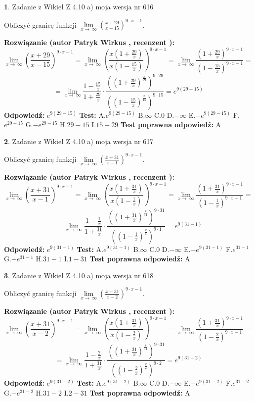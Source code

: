 \documentclass[12pt, a4paper]{article}
\theoremstyle{definition} %
\newtheorem{zad}{}
\newcommand{\zadStart}[1]{\begin{zad}#1\newline}
\newcommand{\zadStop}{\end{zad}}
\newcommand{\rozwStart}[2]{\noindent \textbf{Rozwiązanie (autor #1 , recenzent #2): }\newline}
\newcommand{\rozwStop}{\newline}
\newcommand{\odpStart}{\noindent \textbf{Odpowiedź:}\newline}
\newcommand{\odpStop}{\newline}
\newcommand{\testStart}{\noindent \textbf{Test:}\newline}
\newcommand{\testStop}{\newline}
\newcommand{\kluczStart}{\noindent \textbf{Test poprawna odpowiedź:}\newline}
\newcommand{\kluczStop}{\newline}
\begin{document}
\zadStart{Zadanie z Wikieł Z 4.10 a) moja wersja nr 616}


Obliczyć granicę funkcji  $\lim\limits_{x\to\ \infty}(\frac{x+29}{x-15})^{9\cdot x-1}$.
\zadStop
\rozwStart{Patryk Wirkus}{}
$$\lim\limits_{x\to\ \infty}(\frac{x+29}{x-15})^{9\cdot x-1} = \lim\limits_{x\to\ \infty}(\frac{x(1+\frac{29}{x})}{x(1-\frac{15}{x})})^{9\cdot x-1}=\lim\limits_{x\to\ \infty}\frac{(1+\frac{29}{x})^{9\cdot x-1}}{(1-\frac{15}{x})^{9\cdot x-1}}=$$
$$=\lim\limits_{x\to\ \infty}\frac{1-\frac{15}{x}}{1+\frac{29}{x}}\cdot\frac{((1+\frac{29}{x})^{\frac{x}{29}})^{9\cdot29}}{((1-\frac{15}{x})^{\frac{x}{15}})^{9\cdot15}}=e^{9(29-15)}$$
\rozwStop
\odpStart
$e^{9(29-15)}$
\odpStop
\testStart
A.$e^{9(29-15)}$ B.$\infty$ C.$0$ D.$-\infty$ E.$-e^{9(29-15)}$
F.$e^{29-15}$ G.$-e^{29-15}$
H.$29-15$
I.$15-29$
\testStop
\kluczStart
A
\kluczStop



\zadStart{Zadanie z Wikieł Z 4.10 a) moja wersja nr 617}


Obliczyć granicę funkcji  $\lim\limits_{x\to\ \infty}(\frac{x+31}{x-1})^{9\cdot x-1}$.
\zadStop
\rozwStart{Patryk Wirkus}{}
$$\lim\limits_{x\to\ \infty}(\frac{x+31}{x-1})^{9\cdot x-1} = \lim\limits_{x\to\ \infty}(\frac{x(1+\frac{31}{x})}{x(1-\frac{1}{x})})^{9\cdot x-1}=\lim\limits_{x\to\ \infty}\frac{(1+\frac{31}{x})^{9\cdot x-1}}{(1-\frac{1}{x})^{9\cdot x-1}}=$$
$$=\lim\limits_{x\to\ \infty}\frac{1-\frac{1}{x}}{1+\frac{31}{x}}\cdot\frac{((1+\frac{31}{x})^{\frac{x}{31}})^{9\cdot31}}{((1-\frac{1}{x})^{\frac{x}{1}})^{9\cdot1}}=e^{9(31-1)}$$
\rozwStop
\odpStart
$e^{9(31-1)}$
\odpStop
\testStart
A.$e^{9(31-1)}$ B.$\infty$ C.$0$ D.$-\infty$ E.$-e^{9(31-1)}$
F.$e^{31-1}$ G.$-e^{31-1}$
H.$31-1$
I.$1-31$
\testStop
\kluczStart
A
\kluczStop



\zadStart{Zadanie z Wikieł Z 4.10 a) moja wersja nr 618}


Obliczyć granicę funkcji  $\lim\limits_{x\to\ \infty}(\frac{x+31}{x-2})^{9\cdot x-1}$.
\zadStop
\rozwStart{Patryk Wirkus}{}
$$\lim\limits_{x\to\ \infty}(\frac{x+31}{x-2})^{9\cdot x-1} = \lim\limits_{x\to\ \infty}(\frac{x(1+\frac{31}{x})}{x(1-\frac{2}{x})})^{9\cdot x-1}=\lim\limits_{x\to\ \infty}\frac{(1+\frac{31}{x})^{9\cdot x-1}}{(1-\frac{2}{x})^{9\cdot x-1}}=$$
$$=\lim\limits_{x\to\ \infty}\frac{1-\frac{2}{x}}{1+\frac{31}{x}}\cdot\frac{((1+\frac{31}{x})^{\frac{x}{31}})^{9\cdot31}}{((1-\frac{2}{x})^{\frac{x}{2}})^{9\cdot2}}=e^{9(31-2)}$$
\rozwStop
\odpStart
$e^{9(31-2)}$
\odpStop
\testStart
A.$e^{9(31-2)}$ B.$\infty$ C.$0$ D.$-\infty$ E.$-e^{9(31-2)}$
F.$e^{31-2}$ G.$-e^{31-2}$
H.$31-2$
I.$2-31$
\testStop
\kluczStart
A
\kluczStop
\end{document}
